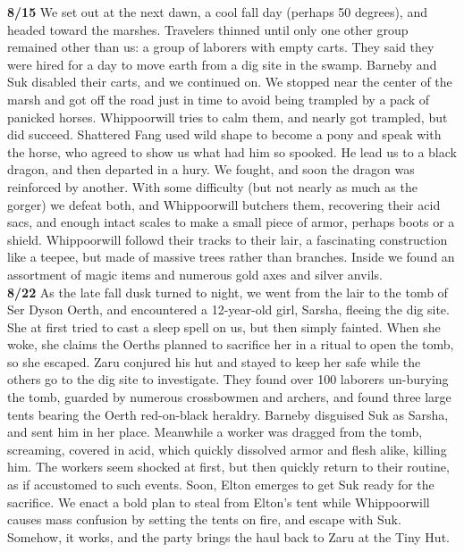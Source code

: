 \documentclass[letterpaper]{article}
\begin{document}
\noindent \textbf{8/15} We set out at the next dawn, a cool fall day (perhaps 50 degrees), and headed toward the marshes.  Travelers thinned until only one other group remained other than us: a group of laborers with empty carts.  They said they were hired for a day to move earth from a dig site in the swamp.  Barneby and Suk disabled their carts, and we continued on.  We stopped near the center of the marsh and got off the road just in time to avoid being trampled by a pack of panicked horses.  Whippoorwill tries to calm them, and nearly got trampled, but did succeed.  Shattered Fang used wild shape to become a pony and speak with the horse, who agreed to show us what had him so spooked.  He lead us to a black dragon, and then departed in a hury.  We fought, and soon the dragon was reinforced by another.  With some difficulty (but not nearly as much as the gorger) we defeat both, and Whippoorwill butchers them, recovering their acid sacs, and enough intact scales to make a small piece of armor, perhaps boots or a shield.  Whippoorwill followd their tracks to their lair, a fascinating construction like a teepee, but made of massive trees rather than branches.  Inside we found an assortment of magic items and numerous gold axes and silver anvils.\\

\noindent \textbf{8/22} As the late fall dusk turned to night, we went from the lair to the tomb of Ser Dyson Oerth, and encountered a 12-year-old girl, Sarsha, fleeing the dig site. She at first tried to cast a sleep spell on us, but then simply fainted. When she woke, she claims the Oerths planned to sacrifice her in a ritual to open the tomb, so she escaped.  Zaru conjured his hut and stayed to keep her safe while the others go to the dig site to investigate. They found over 100 laborers un-burying the tomb, guarded by numerous crossbowmen and archers, and found three large tents bearing the Oerth red-on-black heraldry.  Barneby disguised Suk as Sarsha, and sent him in her place. Meanwhile a worker was dragged from the tomb, screaming, covered in acid, which quickly dissolved armor and flesh alike, killing him.  The workers seem shocked at first, but then quickly return to their routine, as if accustomed to such events.  Soon, Elton emerges to get Suk ready for the sacrifice.  We enact a bold plan to steal from Elton's tent while Whippoorwill causes mass confusion by setting the tents on fire, and escape with Suk.  Somehow, it works, and the party brings the haul back to Zaru at the Tiny Hut.\\
\end{document}
